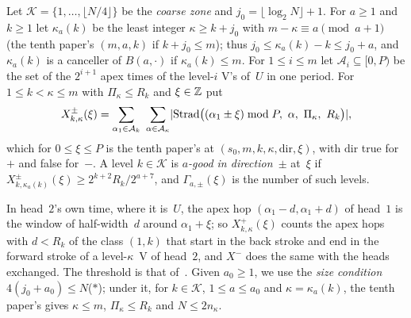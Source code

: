 \begin{definition}\label{def:dnp-straddle}
Let $\mathcal K=\{1,\dots,\lfloor N/4\rfloor\}$ be the \emph{coarse zone} and $j_0=\lfloor\log_2N\rfloor+1$. For $a\ge1$
and $k\ge1$ let $\kappa_a(k)$ be the least integer $\kappa\ge k+j_0$ with $m-\kappa\equiv a\pmod{a+1}$ (the tenth paper's
$(m,a,k)$ if $k+j_0\le m$); thus $j_0\le\kappa_a(k)-k\le j_0+a$, and $\kappa_a(k)$ is a canceller of
$B(a,\cdot)$ if $\kappa_a(k)\le m$. For $1\le i\le m$ let $\mathcal A_i\subseteq[0,P)$ be
the set of the $2^{i+1}$ apex times of the level-$i$ V's of~$U$ in one period. For $1\le k<\kappa\le m$ with
$\Pi_\kappa\le R_k$ and $\xi\in\mathbb{Z}$ put
\[
  X^\pm_{k,\kappa}(\xi)=\sum_{\alpha_1\in\mathcal A_k}\ \sum_{\alpha\in\mathcal A_\kappa}
  \card{\mathrm{Strad}\bigl((\alpha_1\pm\xi)\bmod P,\ \alpha,\ \Pi_\kappa,\ R_k\bigr)},
\]
which for $0\le\xi\le P$ is the tenth paper's  at
$(s_0,m,k,\kappa,\mathrm{dir},\xi)$, with $\mathrm{dir}$ true for~$+$ and false for~$-$. A level $k\in\mathcal K$ is
\emph{$a$-good in direction~$\pm$} at~$\xi$ if
$X^\pm_{k,\kappa_a(k)}(\xi)\ge2^{k+2}R_k/2^{a+7}$, and $\Gamma_{a,\pm}(\xi)$ is the number of such levels.
\end{definition}

In head~$2$'s own time, where it is~$U$, the apex hop $(\alpha_1-d,\alpha_1+d)$ of head~$1$ is the window of
half-width~$d$ around $\alpha_1+\xi$; so $X^+_{k,\kappa}(\xi)$ counts the apex hops with $d<R_k$ of the class $(1,k)$ that
start in the back stroke and end in the forward stroke of a level-$\kappa$~V of head~$2$, and $X^-$ does the same with the
heads exchanged. The threshold is that of~\cite[Theorem~5.5(3)]{DirectedReciprocity2026}. Given $a_0\ge1$, we use the
\emph{size condition} $4(j_0+a_0)\le N$\quad\textup{($\ast$)}; under it, for $k\in\mathcal K$, $1\le a\le a_0$ and
$\kappa=\kappa_a(k)$, the tenth paper's  gives $\kappa\le m$, $\Pi_\kappa\le R_k$ and
$N\le2n_\kappa$.

